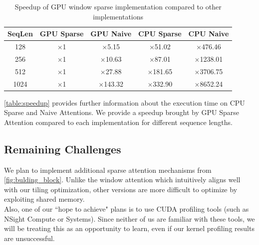 \documentclass[11pt]{article}
\begin{document}
\begin{table}[h!]
\centering
 \begin{tabular}{|c || c c c c|} 
 \hline
  SeqLen & GPU Sparse & GPU Naive & CPU Sparse & CPU Naive \\
 \hline 
    128 & $\times$1 & $\times$5.15 & $\times$51.02 & $\times$476.46 \\
    256 & $\times$1 & $\times$10.63 & $\times$87.01 & $\times$1238.01 \\
    512 & $\times$1 & $\times$27.88 & $\times$181.65 & $\times$3706.75 \\
    1024 & $\times$1 & $\times$143.32 & $\times$332.90 & $\times$8652.24 \\
 \hline
 \end{tabular}
 \caption{Speedup of GPU window sparse implementation compared to other implementations}
 \label{table:speedup}
\end{table}

\autoref{table:speedup} provides further information about the execution time on CPU Sparse and Naive Attentions. We provide a speedup brought by GPU Sparse Attention compared to each implementation for different sequence lengths.


\subsection{Remaining Challenges}

We plan to implement additional sparse attention mechanisms from \autoref{fig:bulding_block}. Unlike the window attention which intuitively aligns well with our tiling optimization, other versions are more difficult to optimize by exploiting shared memory. \\
Also, one of our ``hope to achieve" plans is to use CUDA profiling tools (such as NSight Compute or Systems). Since neither of us are familiar with these tools, we will be treating this as an opportunity to learn, even if our kernel profiling results are unsuccessful.
\end{document}

